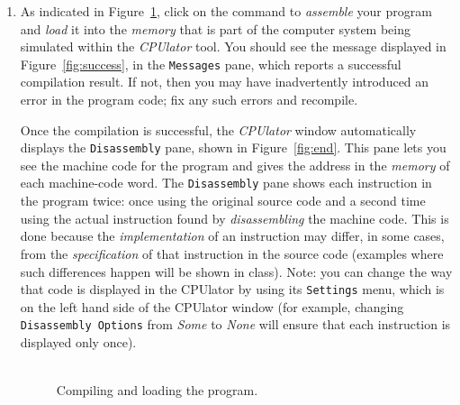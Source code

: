 \documentclass[epsfig,10pt,fullpage]{article}
\begin{document}
\begin{enumerate}
~\\
\item As indicated in Figure~\ref{fig:compile}, click on the 
command to {\it assemble} your program and {\it load} it into the {\it memory} that is
part of the computer system being simulated within the {\it CPUlator} tool. 
You should see the message displayed in Figure~\ref{fig:success}, in the \texttt{Messages} pane, 
which reports a successful compilation result.
If not, then you may have inadvertently introduced an error in the program code; fix any
such errors and recompile. 

Once the compilation is successful, the 
{\it CPUlator} window automatically displays the \texttt{Disassembly}
pane, shown in Figure~\ref{fig:end}. This pane lets you see the machine code for 
the program and gives the address in the {\it memory} of each machine-code word.
The \texttt{Disassembly} pane shows each instruction in the program twice: once using the 
original source code and a second time using the actual instruction found by {\it disassembling} 
the machine code. This is done because the {\it implementation} of an instruction 
may differ, in some cases, from the {\it specification} of that instruction in the source code 
(examples where such differences happen will be shown in class). Note: you can change the
way that code is displayed in the CPUlator by using its \texttt{Settings} menu, which is on
the left hand side of the CPUlator window (for example, changing \texttt{Disassembly Options} 
from {\it Some} to {\it None} will ensure that each instruction is displayed only once).
~\\
~\\

\begin{figure}[h]
	\begin{center}
    \setlength{\fboxsep}{0pt}
	\end{center}
	\caption{Compiling and loading the program.}
\label{fig:compile}
\end{figure}


\end{enumerate}
\end{document}
